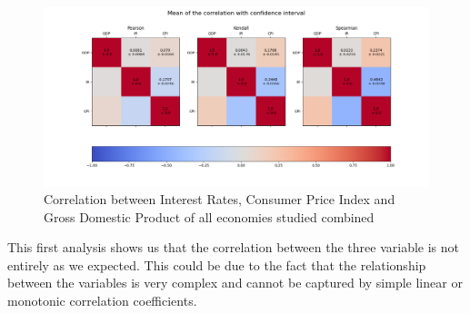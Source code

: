 \begin{figure}[H]
    \centering
    \includegraphics[width=\linewidth]{imgs/all_countries_correlation.png}
    \caption{Correlation between Interest Rates, Consumer Price Index and Gross Domestic Product of all economies studied combined}
    \label{fig:correlation_global}
\end{figure}

This first analysis shows us that the correlation between the three variable is not entirely as we expected. This could be due to the fact that the relationship between the variables is very complex and cannot be captured by simple linear or monotonic correlation coefficients.
